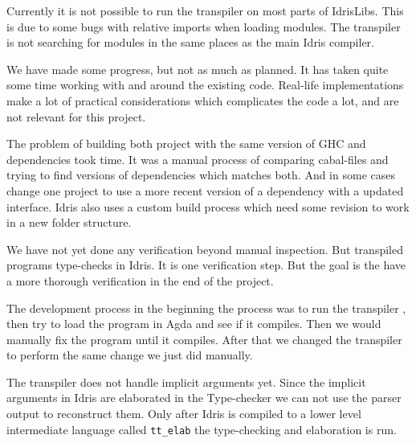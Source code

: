 \documentclass[parskip=half]{scrartcl}
\begin{document}
Currently it is not possible to run the transpiler on most parts of IdrisLibs.
This is due to some bugs with relative imports when loading modules. The
transpiler is not searching for modules in the same places as the main Idris
compiler.

We have made some progress, but not as much as planned. It has taken quite some
time working with and around the existing code.  Real-life implementations make
a lot of practical considerations which complicates the code a lot, and are not
relevant for this project.


The problem of building both project with the same version of GHC and
dependencies took time. It was a manual process of comparing cabal-files and
trying to find versions of dependencies which matches both. And in some cases
change one project to use a more recent version of a dependency with a updated
interface. Idris also uses a custom build process which need some revision to
work in a new folder structure.



We have not yet done any verification beyond manual inspection.  But transpiled
programs type-checks in Idris. It is one verification step.  But the goal is
the have a more thorough verification in the end of the project.

The development process in the beginning the process was to run the transpiler , then try to load the program in Agda and see if it compiles.
Then we would manually fix the program until it compiles.
After that we changed the transpiler to perform the same change we just did
manually.


The transpiler does not handle implicit arguments yet.
Since the implicit arguments in Idris are elaborated in the Type-checker we can
not use the parser output to reconstruct them.
Only after Idris is compiled to a lower level intermediate
language called \texttt{tt\_elab} the type-checking and elaboration is run.
\end{document}
